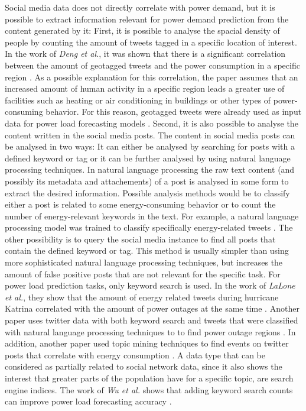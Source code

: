Social media data does not directly correlate with power demand, but it is
possible to extract information relevant for power demand prediction
from the content generated by it:
First, it is possible to analyse the spacial density of people by 
counting the amount of tweets tagged in a specific location of interest. 
In the work of \textit{Deng et al.},
it was shown that there is a significant
correlation between the amount of geotagged tweets
and the power consumption in a specific region \cite{twittergeoloccorr}.
As a possible explanation for this correlation, the paper assumes that 
an increased amount of human activity in a specific region leads a greater 
use of facilities such as heating or air conditioning in buildings or 
other types of power-consuming behavior.
For this reason, geotagged tweets were already used as input data for 
power load forecasting models 
\cite{twittergeolocforecasting} \cite{twittergeolocforecasting2}.
Second, it is also possible to analyse the content written in the 
social media posts. The content in social media posts can be 
analysed in two ways: 
It can either be analysed by searching for posts with a defined keyword or tag
or it can be further analysed by using natural language processing techniques. 
In natural language processing the raw text content 
(and possibly its metadata and attachements) of a post is analysed
in some form to extract the desired information. Possible analysis
methods would be to classify either a post is related to some energy-consuming
behavior or to count the number of energy-relevant keywords in the text.
For example, a natural language processing model was trained to 
classify specifically energy-related tweets \cite{energybert}.
The other possibility is to query the social media instance 
to find all posts that contain the defined keyword or tag.
This method is usually simpler than using more sophisticated natural 
language processing techniques, but increases the amount of false positive 
posts that are not relevant for the specific task.
For power load prediction tasks, only keyword search is used.
In the work of \textit{LaLone et al.}, they show that the amount of energy
related tweets during hurricane Katrina correlated with the amount of 
power outages at the same time \cite{poweroutagetwitter}.
Another paper uses twitter data with both keyword search and 
tweets that were classified with natural language processing techniques to
to find power outage regions \cite{twitterpoweroutagelighttime}.
In addition, another paper used topic mining techniques to find
events on twitter posts that correlate with energy consumption 
\cite{twittertopicevent}.
A data type that can be considered as partially related to social 
network data, since it also shows the interest that greater parts of 
the population have for a specific topic, are search engine indices.
The work of \textit{Wu et al.} shows that adding keyword search counts
can improve power load forecasting accuracy \cite{googlepowerforecast}.

